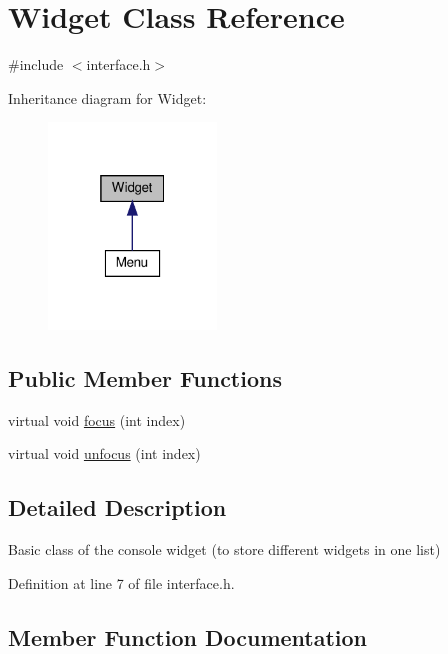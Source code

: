 \hypertarget{class_widget}{}\section{Widget Class Reference}
\label{class_widget}


{\ttfamily \#include $<$interface.\+h$>$}



Inheritance diagram for Widget\+:
\nopagebreak
\begin{figure}[H]
\begin{center}
\leavevmode
\includegraphics[width=127pt]{class_widget__inherit__graph}
\end{center}
\end{figure}
\subsection*{Public Member Functions}
\begin{DoxyCompactItemize}
\item 
virtual void \mbox{\hyperlink{class_widget_ac395fbcfd90f5a33a4bb2ca1d83631ca}{focus}} (int index)
\item 
virtual void \mbox{\hyperlink{class_widget_a65f349812facca8302957a83b161a840}{unfocus}} (int index)
\end{DoxyCompactItemize}


\subsection{Detailed Description}
Basic class of the console widget (to store different widgets in one list) 

Definition at line 7 of file interface.\+h.



\subsection{Member Function Documentation}
\mbox{\label{class_widget_ac395fbcfd90f5a33a4bb2ca1d83631ca}} 
